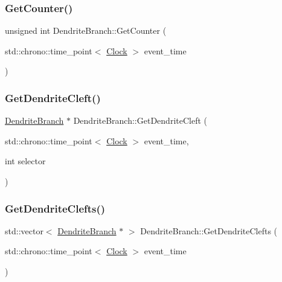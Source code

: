 \subsubsection{\texorpdfstring{Get\+Counter()}{GetCounter()}}
{\footnotesize\ttfamily unsigned int Dendrite\+Branch\+::\+Get\+Counter (\begin{DoxyParamCaption}\item[{std\+::chrono\+::time\+\_\+point$<$ \mbox{\hyperlink{universe_8h_a0ef8d951d1ca5ab3cfaf7ab4c7a6fd80}{Clock}} $>$}]{event\+\_\+time }\end{DoxyParamCaption})\hspace{0.3cm}{\ttfamily [inline]}}

\mbox{\label{classDendriteBranch_a11f25ffce77011afad909acb593d2e42}} 
\subsubsection{\texorpdfstring{Get\+Dendrite\+Cleft()}{GetDendriteCleft()}}
{\footnotesize\ttfamily \mbox{\hyperlink{classDendriteBranch}{Dendrite\+Branch}} $\ast$ Dendrite\+Branch\+::\+Get\+Dendrite\+Cleft (\begin{DoxyParamCaption}\item[{std\+::chrono\+::time\+\_\+point$<$ \mbox{\hyperlink{universe_8h_a0ef8d951d1ca5ab3cfaf7ab4c7a6fd80}{Clock}} $>$}]{event\+\_\+time,  }\item[{int}]{selector }\end{DoxyParamCaption})}

\mbox{\label{classDendriteBranch_a2be44a81b4b5213947e9545400a0453c}} 
\subsubsection{\texorpdfstring{Get\+Dendrite\+Clefts()}{GetDendriteClefts()}}
{\footnotesize\ttfamily std\+::vector$<$ \mbox{\hyperlink{classDendriteBranch}{Dendrite\+Branch}} $\ast$ $>$ Dendrite\+Branch\+::\+Get\+Dendrite\+Clefts (\begin{DoxyParamCaption}\item[{std\+::chrono\+::time\+\_\+point$<$ \mbox{\hyperlink{universe_8h_a0ef8d951d1ca5ab3cfaf7ab4c7a6fd80}{Clock}} $>$}]{event\+\_\+time }\end{DoxyParamCaption})}

